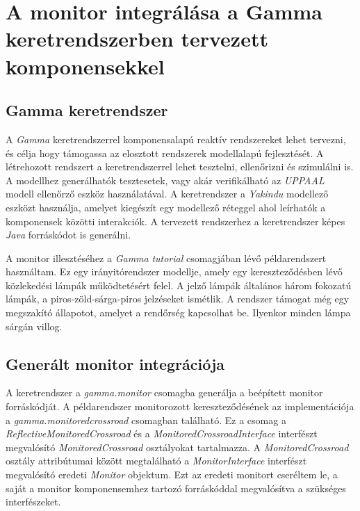 \chapter{A monitor integrálása a Gamma keretrendszerben tervezett komponensekkel}

\section{Gamma keretrendszer}

A \textit{Gamma} keretrendszerrel \cite{Gamma} komponensalapú reaktív rendszereket lehet tervezni, és célja hogy támogassa az elosztott rendszerek modellalapú fejlesztését.
A létrehozott rendszert a keretrendszerrel lehet tesztelni, ellenőrizni és szimulálni is.
A modellhez generálhatók tesztesetek, vagy akár verifikálható az \textit{UPPAAL} \cite{UPPAAL} modell ellenőrző eszköz használatával.
A keretrendszer a \textit{Yakindu} \cite{Yakindu} modellező eszközt használja, amelyet kiegészít egy modellező réteggel ahol leírhatók a komponensek közötti interakciók.
A tervezett rendszerhez a keretrendszer képes \textit{Java} forráskódot is generálni.

A monitor illesztéséhez a \textit{Gamma} \textit{tutorial} csomagjában lévő példarendszert használtam.
Ez egy irányitórendszer modellje, amely egy kereszteződésben lévő közlekedési lámpák működtetésért felel.
A jelző lámpák általános három fokozatú lámpák, a piros-zöld-sárga-piros jelzéseket ismétlik.
A rendszer támogat még egy megszakító állapotot, amelyet a rendőrség kapcsolhat be.
Ilyenkor minden lámpa sárgán villog.

\section{Generált monitor integrációja}

A keretrendszer a \textit{gamma.monitor} csomagba generálja a beépített monitor forráskódját.
A példarendszer monitorozott kereszteződésének az implementációja a \textit{gamma.monitoredcrossroad} csomagban található.
Ez a csomag a \textit{ReflectiveMonitoredCrossroad} és a \textit{MonitoredCrossroadInterface} interfészt megvalósító \textit{MonitoredCrossroad} osztályokat tartalmazza.
A \textit{MonitoredCrossroad} osztály attribútumai között megtalálható a \textit{MonitorInterface} interfészt megvalósító eredeti \textit{Monitor} objektum.
Ezt az eredeti monitort cseréltem le, a saját a monitor komponensemhez tartozó forráskóddal megvalósítva a szükséges interfészeket.

